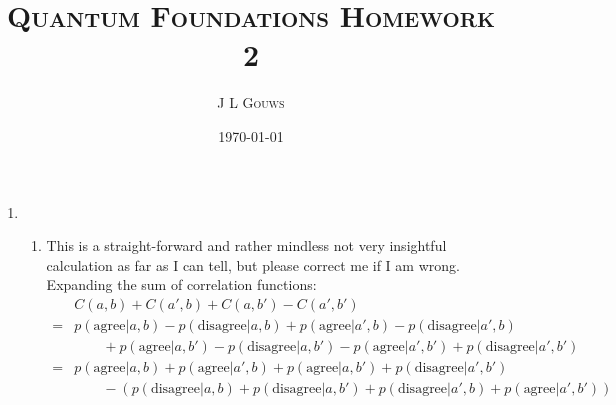 \documentclass[12pt,a4]{article}
\title{
\textsc{Quantum Foundations Homework 2}
}
\author{\textsc{J L Gouws}
}
\date{\today
\\[1cm]}
\begin{document}
\thispagestyle{empty}

\maketitle

\begin{enumerate}
  \item
    \begin{enumerate}
      \item
        This is a straight-forward and rather mindless not very insightful calculation as far as I can tell, but please correct me if I am wrong.
        Expanding the sum of correlation functions:
        \begin{align*}
          & C(a, b) + C(a', b) + C(a, b') - C(a', b')\\
        = & p(\text{agree}|a, b) - p(\text{disagree}|a, b) + p(\text{agree}|a', b) - p(\text{disagree}|a', b)\\
          & \qquad + p(\text{agree}|a, b') - p(\text{disagree}|a, b') - p(\text{agree}|a', b') + p(\text{disagree}|a', b')\\
        = & p(\text{agree}|a, b) + p(\text{agree}|a', b) + p(\text{agree}|a, b')  + p(\text{disagree}|a', b')\\
          & \qquad  - (p(\text{disagree}|a, b) + p(\text{disagree}|a, b') + p(\text{disagree}|a', b) + p(\text{agree}|a', b'))

\end{align*}
\end{enumerate}
\end{enumerate}
\end{document}
